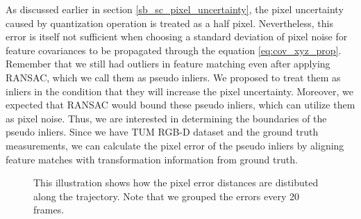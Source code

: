 \documentclass[a4paper]{report}
\numberwithin{figure}{section}
\begin{document}
As discussed earlier in section \ref{sb_sc_pixel_uncertainty}, the pixel 
uncertainty caused by quantization operation is treated as a half pixel.  
Nevertheless, this error is itself not sufficient when choosing a standard 
deviation of pixel noise for feature covariances to be propagated through the 
equation \eqref{eq:cov_xyz_prop}. Remember that we still had outliers in 
feature matching even after applying RANSAC, which we call them as pseudo 
inliers. We proposed to treat them as inliers in the condition that they will 
increase the pixel uncertainty.  Moreover, we expected that RANSAC would bound 
these pseudo inliers, which can utilize them as pixel noise. Thus, we are 
interested in determining the boundaries of the pseudo inliers.  Since we have 
TUM RGB-D dataset and the ground truth measurements, we can calculate the 
pixel error of the pseudo inliers by aligning feature matches with 
transformation information from ground truth.


\begin{figure}[H]  \caption[Time-based Histogram of Pixel Errors]{ This illustration shows how the pixel error distances are distibuted along the trajectory. Note that we grouped the errors every 20 frames.} \label{fig:time_based_hist_pix_err} \end{figure}
\end{document}
